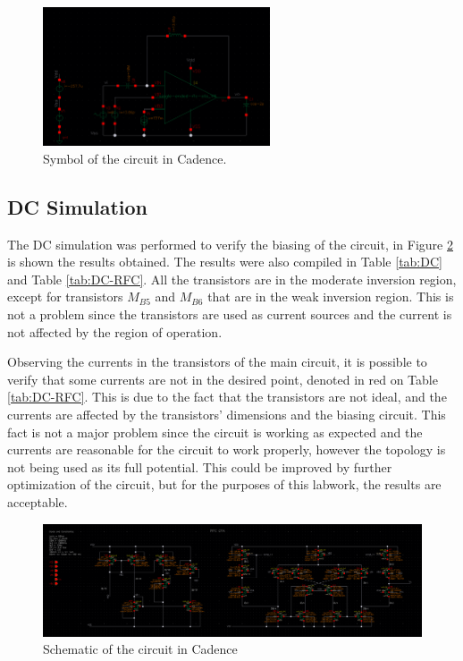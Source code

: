 \begin{figure}[H]
    \centering
    \includegraphics[width=0.6\textwidth]{Images/tb.png}
    \caption{Symbol of the circuit in Cadence.}
    \label{fig:Symbol}
\end{figure}

\subsection{DC Simulation}

The DC simulation was performed to verify the biasing of the circuit, in Figure \ref{fig:DC} is shown the results obtained. The results were also compiled in Table \ref{tab:DC} and Table \ref{tab:DC-RFC}. All the transistors are in the moderate inversion region, except for transistors $M_{B5}$ and $M_{B6}$ that are in the weak inversion region. This is not a problem since the transistors are used as current sources and the current is not affected by the region of operation.

Observing the currents in the transistors of the main circuit, it is possible to verify that some currents are not in the desired point, denoted in red on Table \ref{tab:DC-RFC}. This is due to the fact that the transistors are not ideal, and the currents are affected by the transistors' dimensions and the biasing circuit. This fact is not a major problem since the circuit is working as expected and the currents are reasonable for the circuit to work properly, however the topology is not being used as its full potential. This could be improved by further optimization of the circuit, but for the purposes of this labwork, the results are acceptable.

\begin{figure}[H]
    \centering
    \includegraphics[width=1\textwidth]{Images/OP.png}
    \caption{Schematic of the circuit in Cadence}
    \label{fig:DC}
\end{figure}

